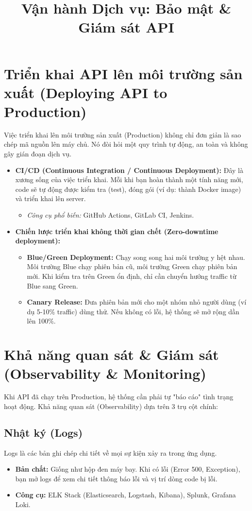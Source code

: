 \documentclass[12pt,a4paper]{article}
\title{\textbf{Vận hành Dịch vụ: Bảo mật \& Giám sát API}}
\author{}
\date{}
\begin{document}
\maketitle

\section{Triển khai API lên môi trường sản xuất (Deploying API to Production)}
Việc triển khai lên môi trường sản xuất (Production) không chỉ đơn giản là sao chép mã nguồn lên máy chủ. Nó đòi hỏi một quy trình tự động, an toàn và không gây gián đoạn dịch vụ.

\begin{itemize}[label=\tiny$\blacksquare$]
    \item \textbf{CI/CD (Continuous Integration / Continuous Deployment):} Đây là xương sống của việc triển khai. Mỗi khi bạn hoàn thành một tính năng mới, code sẽ tự động được kiểm tra (test), đóng gói (ví dụ: thành Docker image) và triển khai lên server. 
    \begin{itemize}
        \item \textit{Công cụ phổ biến:} GitHub Actions, GitLab CI, Jenkins.
    \end{itemize}
    
    \item \textbf{Chiến lược triển khai không thời gian chết (Zero-downtime deployment):}
    \begin{itemize}
        \item \textbf{Blue/Green Deployment:} Chạy song song hai môi trường y hệt nhau. Môi trường Blue chạy phiên bản cũ, môi trường Green chạy phiên bản mới. Khi kiểm tra trên Green ổn định, chỉ cần chuyển hướng traffic từ Blue sang Green.
        \item \textbf{Canary Release:} Đưa phiên bản mới cho một nhóm nhỏ người dùng (ví dụ 5-10\% traffic) dùng thử. Nếu không có lỗi, hệ thống sẽ mở rộng dần lên 100\%.
    \end{itemize}
\end{itemize}

\section{Khả năng quan sát \& Giám sát (Observability \& Monitoring)}
Khi API đã chạy trên Production, hệ thống cần phải tự "báo cáo" tình trạng hoạt động. Khả năng quan sát (Observability) dựa trên 3 trụ cột chính:

\subsection{Nhật ký (Logs)}
Logs là các bản ghi chép chi tiết về mọi sự kiện xảy ra trong ứng dụng.
\begin{itemize}
    \item \textbf{Bản chất:} Giống như hộp đen máy bay. Khi có lỗi (Error 500, Exception), bạn mở logs để xem chi tiết thông báo lỗi và vị trí dòng code bị lỗi.
    \item \textbf{Công cụ:} ELK Stack (Elasticsearch, Logstash, Kibana), Splunk, Grafana Loki.
\end{itemize}
\end{document}
